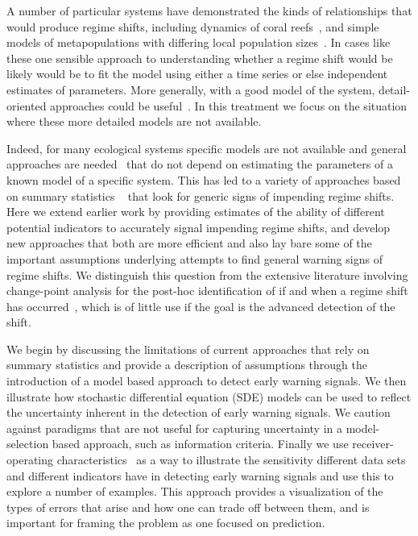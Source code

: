 \documentclass[authoryear,review,11pt]{elsarticle}
\begin{document}
A number of particular systems have demonstrated the kinds of relationships that would produce regime shifts,
including dynamics of coral reefs~\citep{Mumby2007},
and simple models of metapopulations with differing local population sizes~\citep{Hastings1991a}.
In cases like these one sensible approach to understanding 
whether a regime shift would be likely would be 
to fit the model using either a time series or else independent estimates of parameters. 
More generally, with a good model of the system, detail-oriented approaches could be useful~\citep{Lade2012}.  
In this treatment we focus on the situation where these more detailed models are not available.  

Indeed, for many ecological systems specific models are not available and general approaches are needed~\citep{Scheffer2009, Lade2012}
that do not depend on estimating the parameters of a known model of a specific system. 
This has led to a variety of approaches based on summary statistics
~\citep[\emph{e.g.}][]{Carpenter2006, Held2004, Dakos2008, Guttal2008, Biggs2009, Carpenter2011, Seekell2011}
that look for generic signs of impending regime shifts.  
Here we extend earlier work by providing estimates 
of the ability of different potential indicators to accurately signal impending regime shifts,
and develop new approaches that both are more efficient
and also lay bare some of the important assumptions underlying attempts 
to find general warning signs of regime shifts.  
We distinguish this question from the extensive literature involving change-point analysis 
for the post-hoc identification of if and when a regime shift has occurred~\citep{Easterling1995, Rodionov2004, Lenton2009}, 
which is of little use if the goal is the advanced detection of the shift.  


We begin by discussing the limitations of current approaches that rely on summary statistics
and provide a description of assumptions through the introduction of a model based approach to detect early warning signals.
We then illustrate how stochastic differential equation (SDE) models can be used
to reflect the uncertainty inherent in the detection of early warning signals. 
We caution against paradigms that are not useful for capturing uncertainty in
a model-selection based approach, such as information criteria.
Finally we use receiver-operating characteristics~\citep{Green1989, Keller2009}
as a way to illustrate the sensitivity different data sets
and different indicators have in detecting early warning signals and use this to explore a number of examples.
This approach provides a visualization of the types of errors that arise and how one can trade off between them,
and is important for framing the problem as one focused on prediction.  
\end{document}
